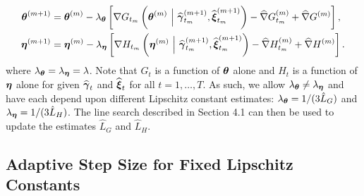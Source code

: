 \begin{align}
    \boldsymbol{\theta}^{(m+1)} &= \boldsymbol{\theta}^{(m)} - \lambda_{\boldsymbol{\theta}} \left[\nabla G_{t_m}\left(\boldsymbol{\theta}^{(m)} ~ \Big | ~ \widehat {\boldsymbol{\gamma}}_{t_m}^{(m+1)}, \widehat {\boldsymbol{\xi}}_{t_m}^{(m+1)}\right) - \widehat \nabla G_{t_m}^{(m)} + \widehat \nabla G^{(m)} \right], \\
    \boldsymbol{\eta}^{(m+1)} &= \boldsymbol{\eta}^{(m)} - \lambda_{\boldsymbol{\eta}} \left[\nabla H_{t_m}\left(\boldsymbol{\eta}^{(m)} ~ \Big | ~ \widehat {\boldsymbol{\gamma}}_{t_m}^{(m+1)}, \widehat {\boldsymbol{\xi}}_{t_m}^{(m+1)}\right) - \widehat \nabla H_{t_m}^{(m)} + \widehat \nabla H^{(m)} \right].
\end{align}
%
where $\lambda_{\boldsymbol{\theta}} = \lambda_{\boldsymbol{\eta}} = \lambda$. Note that $G_t$ is a function of $\boldsymbol{\theta}$ alone and $H_t$ is a function of $\boldsymbol{\eta}$ alone for given $\widehat {\boldsymbol{\gamma}}_{t}$ and $\widehat {\boldsymbol{\xi}}_{t}$ for all $t = 1,\ldots,T$. As such, we allow $\lambda_{\boldsymbol{\theta}} \neq \lambda_{\boldsymbol{\eta}}$ and have each depend upon different Lipschitz constant estimates: $\lambda_{\boldsymbol{\theta}} = 1/(3\hat L_G)$ and $\lambda_{\boldsymbol{\eta}} = 1/(3\hat L_H)$. The line search described in Section 4.1 can then be used to update the estimates $\hat L_G$ and $\hat L_H$.

\subsection{Adaptive Step Size for Fixed Lipschitz Constants}
\label{subsec:L_divider}

